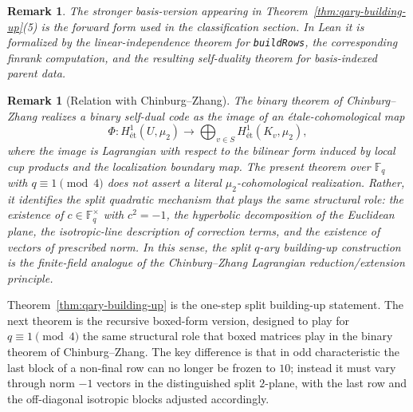 \documentclass[12pt]{article}
\newtheorem{remark}[theorem]{Remark}
\newcommand{\et}{\mathrm{ét}}
\begin{document}
\begin{remark}
{\rm
The stronger basis-version appearing in Theorem~\ref{thm:qary-building-up}(5) is the forward form used in the classification section. In Lean it is formalized by the linear-independence theorem for \texttt{buildRows}, the corresponding finrank computation, and the resulting self-duality theorem for basis-indexed parent data.
}
\end{remark}

\medskip

\begin{remark}[Relation with Chinburg--Zhang]
{\rm
The binary theorem of Chinburg--Zhang realizes a binary self-dual code as the image of an \'etale-cohomological map
\[
\Phi : H^1_{\et}(U,\mu_2) \longrightarrow \bigoplus_{v\in S} H^1_{\et}(K_v,\mu_2),
\]
where the image is Lagrangian with respect to the bilinear form induced by local cup products and the localization boundary map.
The present theorem over $\mathbb{F}_q$ with $q \equiv 1 \pmod{4}$ does not assert a literal $\mu_2$-cohomological realization.
Rather, it identifies the split quadratic mechanism that plays the same structural role: the existence of $c \in \mathbb{F}_q^\times$ with $c^2=-1$, the hyperbolic decomposition of the Euclidean plane, the isotropic-line description of correction terms, and the existence of vectors of prescribed norm.
In this sense, the split $q$-ary building-up construction is the finite-field analogue of the Chinburg--Zhang Lagrangian reduction/extension principle.
}
\end{remark}


Theorem~\ref{thm:qary-building-up} is the one-step split building-up statement. The next theorem is the recursive boxed-form version, designed to play for \(q\equiv 1\pmod 4\) the same structural role that boxed matrices play in the binary theorem of Chinburg--Zhang. The key difference is that in odd characteristic the last block of a non-final row can no longer be frozen to \(10\); instead it must vary through norm \(-1\) vectors in the distinguished split \(2\)-plane, with the last row and the off-diagonal isotropic blocks adjusted accordingly.
\end{document}
